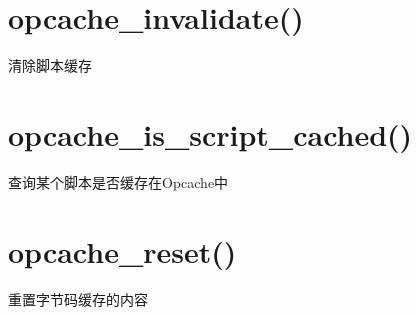 \section{opcache\_invalidate()}

清除脚本缓存

\section{opcache\_is\_script\_cached()}

查询某个脚本是否缓存在Opcache中

\section{opcache\_reset()}

重置字节码缓存的内容






